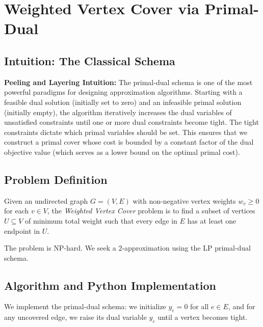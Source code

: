 \setcounter{chapter}{14}
\chapter{Weighted Vertex Cover via Primal-Dual}
\label{ch:weighted_vc_pd}

\section{Intuition: The Classical Schema}

\begin{intuitionbox}
\textbf{Peeling and Layering Intuition:} The primal-dual schema is one of the most powerful paradigms for designing approximation algorithms. Starting with a feasible dual solution (initially set to zero) and an infeasible primal solution (initially empty), the algorithm iteratively increases the dual variables of unsatisfied constraints until one or more dual constraints become tight. The tight constraints dictate which primal variables should be set. This ensures that we construct a primal cover whose cost is bounded by a constant factor of the dual objective value (which serves as a lower bound on the optimal primal cost).
\end{intuitionbox}

\section{Problem Definition}
Given an undirected graph $G = (V, E)$ with non-negative vertex weights $w_v \ge 0$ for each $v \in V$, the \emph{Weighted Vertex Cover} problem is to find a subset of vertices $U \subseteq V$ of minimum total weight such that every edge in $E$ has at least one endpoint in $U$.

The problem is NP-hard. We seek a 2-approximation using the LP primal-dual schema.

\section{Algorithm and Python Implementation}
We implement the primal-dual schema: we initialize $y_e = 0$ for all $e \in E$, and for any uncovered edge, we raise its dual variable $y_e$ until a vertex becomes tight.

